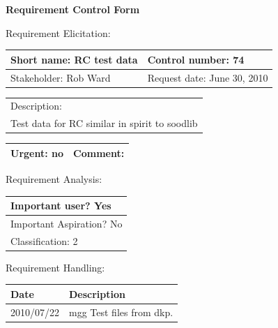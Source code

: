 \begin{center}\Large\bf
Requirement Control Form
\end{center}
\vspace{24pt}

Requirement Elicitation:

\begin{tabular}{|p{211pt}|p{211pt}|} \hline
Short name: RC test data & Control number: 74\\ \hline
Stakeholder: Rob Ward & Request date: June 30, 2010\\
\end{tabular}
\begin{tabular}{|p{433pt}|} \hline
Description: \\ 
Test data for RC similar in spirit to soodlib
\\ \hline
\end{tabular} 
\begin{tabular}{|p{211pt}|p{211pt}|} \hline
Urgent: no & Comment:
\\ \hline
\end{tabular}

\vspace{24pt}

Requirement Analysis:

\begin{tabular}{|p{433pt}|} \hline
Important user? Yes \\ \hline
Important Aspiration? No \\ \hline
Classification: 2 \\ \hline
\end{tabular}
\vspace{24pt}

Requirement Handling:

\begin{tabular}{|p{72pt}|p{351pt}|} \hline
Date & Description \\ \hline
2010/07/22 & mgg Test files from dkp.\\ \hline
\end{tabular}
